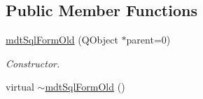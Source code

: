 \subsection*{Public Member Functions}
\begin{DoxyCompactItemize}
\item 
\hypertarget{classmdt_sql_form_old_a55ed87f44538a5da6454eadddaca141b}{
\hyperlink{classmdt_sql_form_old_a55ed87f44538a5da6454eadddaca141b}{mdtSqlFormOld} (QObject $\ast$parent=0)}
\label{classmdt_sql_form_old_a55ed87f44538a5da6454eadddaca141b}

\begin{DoxyCompactList}\small\item\em Constructor. \end{DoxyCompactList}\item 
\hypertarget{classmdt_sql_form_old_ad851ab38078281361d80f733680db0d6}{
virtual \hyperlink{classmdt_sql_form_old_ad851ab38078281361d80f733680db0d6}{$\sim$mdtSqlFormOld} ()}
\label{classmdt_sql_form_old_ad851ab38078281361d80f733680db0d6}


\end{DoxyCompactItemize}
